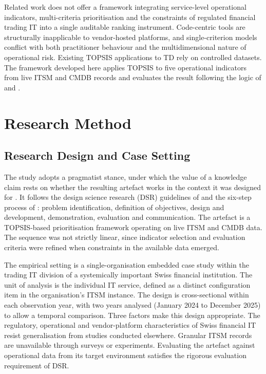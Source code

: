 \documentclass[
  authoryear,
  preprint]{elsarticle}
\begin{document}
Related work does not offer a framework integrating service-level
operational indicators, multi-criteria prioritisation and the
constraints of regulated financial trading IT into a single auditable
ranking instrument. Code-centric tools are structurally inapplicable to
vendor-hosted platforms, and single-criterion models conflict with both
practitioner behaviour and the multidimensional nature of operational
risk. Existing TOPSIS applications to TD rely on controlled datasets.
The framework developed here applies TOPSIS to five operational
indicators from live ITSM and CMDB records and evaluates the result
following the logic of \citet{grecoMethodologicalFrameworkComposite2019}
and \citet{albarakManagingTechnicalDebt2022}.

\section{Research Method}\label{sec-method}

\subsection{Research Design and Case
Setting}\label{research-design-and-case-setting}

The study adopts a pragmatist stance, under which the value of a
knowledge claim rests on whether the resulting artefact works in the
context it was designed for \citep{kellyThreePrinciplesPragmatism2020}.
It follows the design science research (DSR) guidelines of
\citet{hevnerDesignScienceInformation2004} and the six-step process of
\citet{peffersDesignScienceResearch2007}: problem identification,
definition of objectives, design and development, demonstration,
evaluation and communication. The artefact is a TOPSIS-based
prioritisation framework operating on live ITSM and CMDB data. The
sequence was not strictly linear, since indicator selection and
evaluation criteria were refined when constraints in the available data
emerged.

The empirical setting is a single-organisation embedded case study
within the trading IT division of a systemically important Swiss
financial institution. The unit of analysis is the individual IT
service, defined as a distinct configuration item in the organisation's
ITSM instance. The design is cross-sectional within each observation
year, with two years analysed (January 2024 to December 2025) to allow a
temporal comparison. Three factors make this design appropriate. The
regulatory, operational and vendor-platform characteristics of Swiss
financial IT resist generalisation from studies conducted elsewhere.
Granular ITSM records are unavailable through surveys or experiments.
Evaluating the artefact against operational data from its target
environment satisfies the rigorous evaluation requirement of DSR.
\end{document}
